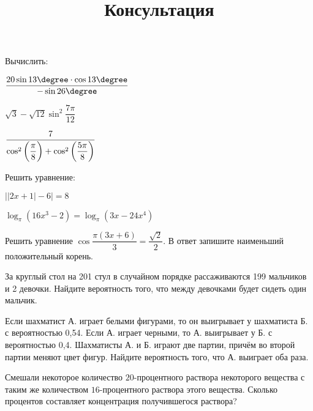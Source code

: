 \begin{listofex}
	\item Вычислить:
	\begin{enumcols}[itemcolumns=2]
		\item {}
		\item {}
		\item \( \dfrac{20\sin13\degree\cdot\cos13\degree}{-\sin26\degree} \)
		\item \( \sqrt{3}-\sqrt{12}\sin^2\dfrac{7\pi}{12} \)
		\item \( \dfrac{7}{\cos^2\left( \dfrac{\vphantom{9}\pi}{8} \right)+\cos^2\left( \dfrac{5\pi}{8} \right)} \)
	\end{enumcols}
	\item Решить уравнение:
	\begin{enumcols}[itemcolumns=2]
		\item \( \big||2x + 1|-6\big|= 8 \)
		\item \(\log_\pi(16x^3-2)=\log_\pi(3x-24x^4) \)
		\item {}
		\item {}
	\end{enumcols}
	\item {}
	\item Решить уравнение \( \cos\dfrac{\pi(3x+6)}{3}=\dfrac{\sqrt{2}}{2} \). В ответ запишите наименьший положительный корень.
	\item За круглый стол на 201 стул в случайном порядке рассаживаются 199 мальчиков и 2 девочки. Найдите вероятность того, что между девочками будет сидеть один мальчик.
	\item Если шахматист А. играет белыми фигурами, то он выигрывает у шахматиста Б. с вероятностью 0,54. Если А. играет черными, то А. выигрывает у Б. с вероятностью 0,4. Шахматисты А. и Б. играют две партии, причём во второй партии меняют цвет фигур. Найдите вероятность того, что А. выиграет оба раза.
	\item Смешали некоторое количество \( 20 \)-процентного раствора некоторого вещества с таким же количеством \( 16 \)-процентного раствора этого вещества. Сколько процентов составляет концентрация получившегося раствора?
	\item {}
	\item {}
	\item {}
	\item {}
\end{listofex}
\newpage
\title{Консультация}
\begin{listofex}
	\item {}
	\item {}
	\item {}
	\item {}
	\item {}
	\item {}
\end{listofex}
